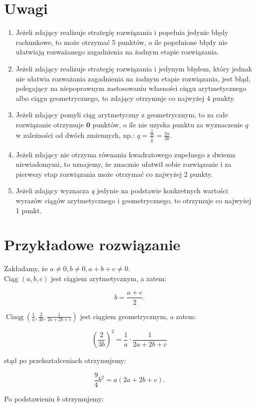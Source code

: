 \documentclass[10pt]{article}
\begin{document}
\section*{Uwagi}
\begin{enumerate}
  \item Jeżeli zdający realizuje strategię rozwiązania i popełnia jedynie błędy rachunkowe, to może otrzymać 5 punktów, o ile popełnione błędy nie ułatwiają rozważanego zagadnienia na żadnym etapie rozwiązania.
  \item Jeżeli zdający realizuje strategię rozwiązania i jedynym błędem, który jednak nie ułatwia rozważania zagadnienia na żadnym etapie rozwiązania, jest błąd, polegający na niepoprawnym zastosowaniu własności ciągu arytmetycznego albo ciągu geometrycznego, to zdający otrzymuje co najwyżej 4 punkty.
  \item Jeżeli zdający pomyli ciąg arytmetyczny z geometrycznym, to za całe rozwiązanie otrzymuje $\mathbf{0}$ punktów, o ile nie uzyska punktu za wyznaczenie $q$ w zależności od dwóch zmiennych, np.: $q=\frac{\frac{2}{3 b}}{\frac{1}{a}}=\frac{2 a}{3 b}$.
  \item Jeżeli zdający nie otrzyma równania kwadratowego zupełnego z dwiema niewiadomymi, to uznajemy, że znacznie ułatwił sobie rozwiązanie i za pierwszy etap rozwiązania może otrzymać co najwyżej 2 punkty.
  \item Jeżeli zdający wyznacza $q$ jedynie na podstawie konkretnych wartości wyrazów ciągów arytmetycznego i geometrycznego, to otrzymuje co najwyżej 1 punkt.
\end{enumerate}

\section*{Przykładowe rozwiązanie}
Zakładamy, że $a \neq 0, b \neq 0, a+b+c \neq 0$.\\
Ciąg $(a, b, c)$ jest ciągiem arytmetycznym, a zatem:

$$
b=\frac{a+c}{2} .
$$

$\operatorname{Ciaqg}\left(\frac{1}{a}, \frac{2}{3 b}, \frac{1}{2 a+2 b+c}\right)$ jest ciągiem geometrycznym, a zatem:

$$
\left(\frac{2}{3 b}\right)^{2}=\frac{1}{a} \cdot \frac{1}{2 a+2 b+c}
$$

stąd po przekształceniach otrzymujemy:

$$
\frac{9}{4} b^{2}=a(2 a+2 b+c) .
$$

Po podstawieniu $b$ otrzymujemy:
\end{document}
